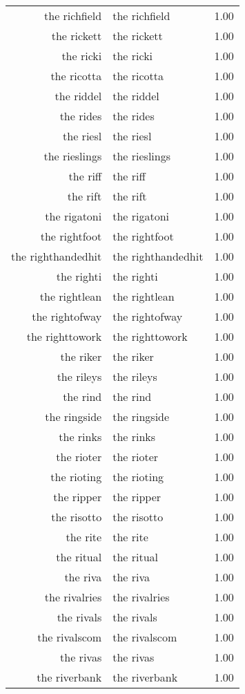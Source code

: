 \begin{table}[ht]
\begin{tabular}{rlr}
  the richfield & the richfield & 1.00 \\ 
  the rickett & the rickett & 1.00 \\ 
  the ricki & the ricki & 1.00 \\ 
  the ricotta & the ricotta & 1.00 \\ 
  the riddel & the riddel & 1.00 \\ 
  the rides & the rides & 1.00 \\ 
  the riesl & the riesl & 1.00 \\ 
  the rieslings & the rieslings & 1.00 \\ 
  the riff & the riff & 1.00 \\ 
  the rift & the rift & 1.00 \\ 
  the rigatoni & the rigatoni & 1.00 \\ 
  the rightfoot & the rightfoot & 1.00 \\ 
  the righthandedhit & the righthandedhit & 1.00 \\ 
  the righti & the righti & 1.00 \\ 
  the rightlean & the rightlean & 1.00 \\ 
  the rightofway & the rightofway & 1.00 \\ 
  the righttowork & the righttowork & 1.00 \\ 
  the riker & the riker & 1.00 \\ 
  the rileys & the rileys & 1.00 \\ 
  the rind & the rind & 1.00 \\ 
  the ringside & the ringside & 1.00 \\ 
  the rinks & the rinks & 1.00 \\ 
  the rioter & the rioter & 1.00 \\ 
  the rioting & the rioting & 1.00 \\ 
  the ripper & the ripper & 1.00 \\ 
  the risotto & the risotto & 1.00 \\ 
  the rite & the rite & 1.00 \\ 
  the ritual & the ritual & 1.00 \\ 
  the riva & the riva & 1.00 \\ 
  the rivalries & the rivalries & 1.00 \\ 
  the rivals & the rivals & 1.00 \\ 
  the rivalscom & the rivalscom & 1.00 \\ 
  the rivas & the rivas & 1.00 \\ 
  the riverbank & the riverbank & 1.00 \\ 

\end{tabular}
\end{table}
